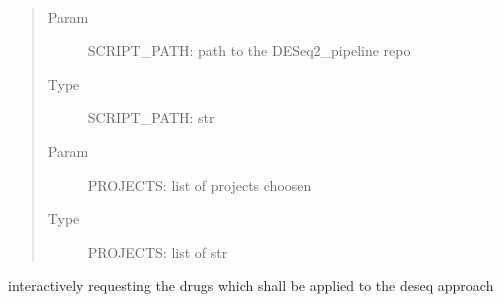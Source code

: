 \documentclass[letterpaper,10pt,english]{sphinxmanual}
\begin{document}
\begin{fulllineitems}
\label{\detokenize{index:choose_therapy.Choose_drugs}}~\begin{quote}\begin{description}
\item[{Param}] \leavevmode
\sphinxAtStartPar
SCRIPT\_PATH: path to the DESeq2\_pipeline repo

\item[{Type}] \leavevmode
\sphinxAtStartPar
SCRIPT\_PATH: str

\item[{Param}] \leavevmode
\sphinxAtStartPar
PROJECTS: list of projects choosen

\item[{Type}] \leavevmode
\sphinxAtStartPar
PROJECTS: list of str

\end{description}\end{quote}

\sphinxAtStartPar
interactively requesting the drugs which shall be applied to the deseq
approach

\end{fulllineitems}

\end{document}
